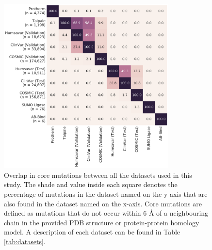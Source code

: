 \clearpage

\begin{figure}[tb]
	\centering
	\includegraphics[width=0.8\textwidth]{static/elaspic_training_set/data_statistics/training_set_overlap_data_df_tt_core.pdf}
	\caption[Overlap in core mutation datasets.]{
		Overlap in core mutations between all the datasets used in this study.
		The shade and value inside each square denotes the percentage of mutations in the dataset named on the y-axis that are also found in the dataset named on the x-axis.
		Core mutations are defined as mutations that do not occur within 6 {\AA} of a neighbouring chain in the provided PDB structure or protein-protein homology model.
		A description of each dataset can be found in Table \ref{tab:datasets}.
	}
	\label{fig:training_set_overlap_core}
\end{figure}

\clearpage

